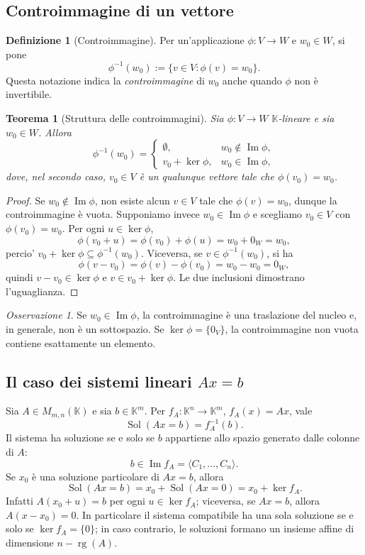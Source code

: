 \documentclass[11pt,a4paper]{article}
\newcommand{\KK}{\mathbb{K}}
\theoremstyle{plain}
\newtheorem{teo}[prop]{Teorema}
\theoremstyle{definition}
\newtheorem{defn}[prop]{Definizione}
\theoremstyle{remark}
\newtheorem{oss}[prop]{Osservazione}
\begin{document}
\subsection{Controimmagine di un vettore}

\begin{defn}[Controimmagine]
Per un'applicazione $\phi:V\to W$ e $w_0\in W$, si pone
\[
 \phi^{-1}(w_0):=\{v\in V:\phi(v)=w_0\}.
\]
Questa notazione indica la \emph{controimmagine} di $w_0$ anche quando
$\phi$ non è invertibile.
\end{defn}

\begin{teo}[Struttura delle controimmagini]
Sia $\phi:V\to W$ $\KK$-lineare e sia $w_0\in W$. Allora
\[
 \boxed{\phi^{-1}(w_0)=
 \begin{cases}
 \emptyset,&w_0\notin\operatorname{Im}\phi,\\
 v_0+\ker\phi,&w_0\in\operatorname{Im}\phi,
 \end{cases}}
\]
dove, nel secondo caso, $v_0\in V$ è un qualunque vettore tale che
$\phi(v_0)=w_0$.
\end{teo}
\begin{proof}
Se $w_0\notin\operatorname{Im}\phi$, non esiste alcun $v\in V$ tale
che $\phi(v)=w_0$, dunque la controimmagine è vuota.
Supponiamo invece $w_0\in\operatorname{Im}\phi$ e scegliamo
$v_0\in V$ con $\phi(v_0)=w_0$.
Per ogni $u\in\ker\phi$,
\[
 \phi(v_0+u)=\phi(v_0)+\phi(u)=w_0+0_W=w_0,
\]
percio' $v_0+\ker\phi\subseteq\phi^{-1}(w_0)$.
Viceversa, se $v\in\phi^{-1}(w_0)$, si ha
\[
 \phi(v-v_0)=\phi(v)-\phi(v_0)=w_0-w_0=0_W,
\]
quindi $v-v_0\in\ker\phi$ e $v\in v_0+\ker\phi$.
Le due inclusioni dimostrano l'uguaglianza.
\end{proof}

\begin{oss}
Se $w_0\in\operatorname{Im}\phi$, la controimmagine è una traslazione
del nucleo e, in generale, non è un sottospazio. Se $\ker\phi=\{0_V\}$,
la controimmagine non vuota contiene esattamente un elemento.
\end{oss}

\subsection{Il caso dei sistemi lineari $Ax=b$}

Sia $A\in M_{m,n}(\KK)$ e sia $b\in\KK^m$. Per
$f_A:\KK^n\to\KK^m$, $f_A(x)=Ax$, vale
\[
 \operatorname{Sol}(Ax=b)=f_A^{-1}(b).
\]
Il sistema ha soluzione se e solo se $b$ appartiene allo spazio generato
dalle colonne di $A$:
\[
 b\in\operatorname{Im}f_A=\langle C_1,\ldots,C_n\rangle.
\]
Se $x_0$ è una soluzione particolare di $Ax=b$, allora
\[
 \boxed{\operatorname{Sol}(Ax=b)
 =x_0+\operatorname{Sol}(Ax=0)
 =x_0+\ker f_A.}
\]
Infatti $A(x_0+u)=b$ per ogni $u\in\ker f_A$; viceversa, se $Ax=b$,
allora $A(x-x_0)=0$. In particolare il sistema compatibile ha
una sola soluzione se e solo se $\ker f_A=\{0\}$; in caso contrario,
le soluzioni formano un insieme affine di dimensione
$n-\operatorname{rg}(A)$.
\end{document}

